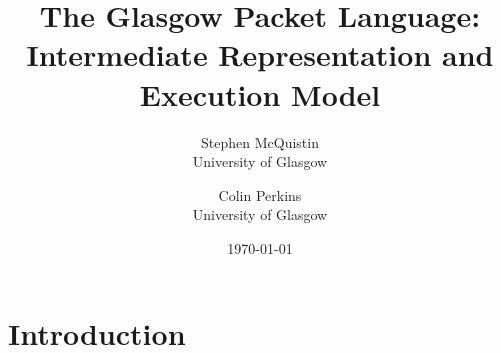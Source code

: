 \documentclass[twocolumn,a4paper]{article}
\begin{document}
\title{The Glasgow Packet Language: Intermediate Representation and Execution Model}
\author{
  Stephen McQuistin\\University of Glasgow
\and 
  Colin Perkins\\University of Glasgow
}
\date{\today}
\maketitle
\begin{abstract}




\end{abstract}
\section{Introduction}










\end{document}
